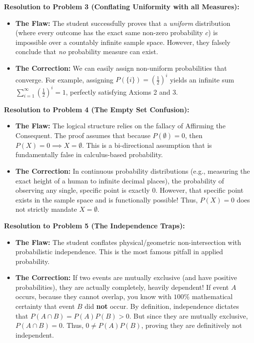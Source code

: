 \documentclass[12pt]{article}
\begin{document}
\textbf{Resolution to Problem 3 (Conflating Uniformity with all Measures):}
\begin{itemize}
    \item \textbf{The Flaw:} The student successfully proves that a \textit{uniform} distribution (where every outcome has the exact same non-zero probability $c$) is impossible over a countably infinite sample space. However, they falsely conclude that \textit{no} probability measure can exist.
    \item \textbf{The Correction:} We can easily assign non-uniform probabilities that converge. For example, assigning $P(\{i\}) = (\frac{1}{2})^i$ yields an infinite sum $\sum_{i=1}^\infty (\frac{1}{2})^i = 1$, perfectly satisfying Axioms 2 and 3.
\end{itemize}

\textbf{Resolution to Problem 4 (The Empty Set Confusion):}
\begin{itemize}
    \item \textbf{The Flaw:} The logical structure relies on the fallacy of Affirming the Consequent. The proof assumes that because $P(\emptyset) = 0$, then $P(X) = 0 \implies X = \emptyset$. This is a bi-directional assumption that is fundamentally false in calculus-based probability.
    \item \textbf{The Correction:} In continuous probability distributions (e.g., measuring the exact height of a human to infinite decimal places), the probability of observing any single, specific point is exactly $0$. However, that specific point exists in the sample space and is functionally possible! Thus, $P(X) = 0$ does not strictly mandate $X = \emptyset$.
\end{itemize}

\textbf{Resolution to Problem 5 (The Independence Traps):}
\begin{itemize}
    \item \textbf{The Flaw:} The student conflates physical/geometric non-intersection with probabilistic independence. This is the most famous pitfall in applied probability. 
    \item \textbf{The Correction:} If two events are mutually exclusive (and have positive probabilities), they are actually completely, heavily dependent! If event $A$ occurs, because they cannot overlap, you know with $100\%$ mathematical certainty that event $B$ did \textbf{not} occur. By definition, independence dictates that $P(A \cap B) = P(A)P(B) > 0$. But since they are mutually exclusive, $P(A \cap B) = 0$. Thus, $0 \neq P(A)P(B)$, proving they are definitively not independent. 
\end{itemize}
\end{document}
